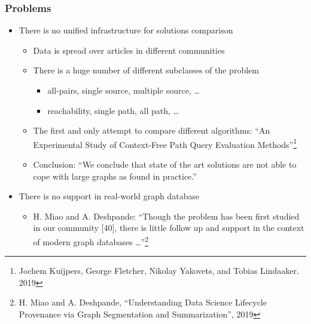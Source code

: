 \documentclass[xcolor=table,aspectratio=169]{beamer}
\begin{document}
\begin{frame}[fragile]
  \frametitle{Problems}
  \begin{itemize}    
    \item There is no unified infrastructure for solutions comparison
    \begin{itemize}
      \item Data is spread over articles in different communities
      \item There is a huge number of different subclasses of the problem
      \begin{itemize}
        \item all-pairs, single source, multiple source, \dots 
        \item reachability, single path, all path, \dots 
      \end{itemize}
      \item The first and only attempt to compare different algorithms: ``An Experimental Study of Context-Free Path Query Evaluation Methods''\footnote{Jochem Kuijpers, George Fletcher, Nikolay Yakovets, and Tobias Lindaaker. 2019}
      \pause
      \item Conclusion: ``We conclude that state of the art solutions are not able to cope with large graphs as found in practice.''
    \end{itemize}
    \pause
    \item There is no support in real-world graph database
    \begin{itemize}
      \item H. Miao and A. Deshpande: ``Though the problem has been first studied in our community [40], there is little follow up and support in the context of modern graph databases \dots''\footnote{H. Miao and A. Deshpande,  ``Understanding Data Science Lifecycle Provenance via Graph Segmentation and Summarization'', 2019}       
    \end{itemize}
  \end{itemize}
\end{frame}
\end{document}
